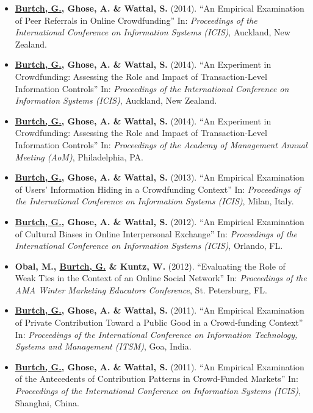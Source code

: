 \documentclass[10.5pt,letterpaper,sans]{moderncv}        %
\begin{document}
\begin{itemize}
\item \textbf{\underline{Burtch, G.}, Ghose, A. \& Wattal, S.} (2014). ``An Empirical Examination of Peer Referrals in Online Crowdfunding'' In: \textit{Proceedings of the International Conference on Information Systems (ICIS)}, Auckland, New Zealand.

\item \textbf{\underline{Burtch, G.}, Ghose, A. \& Wattal, S.} (2014). ``An Experiment in Crowdfunding: Assessing the Role and Impact of Transaction-Level Information Controls'' In: \textit{Proceedings of the International Conference on Information Systems (ICIS)}, Auckland, New Zealand.

\item \textbf{\underline{Burtch, G.}, Ghose, A. \& Wattal, S.} (2014). ``An Experiment in Crowdfunding: Assessing the Role and Impact of Transaction-Level Information Controls'' In: \textit{Proceedings of the Academy of Management Annual Meeting (AoM)}, Philadelphia, PA.

\item \textbf{\underline{Burtch, G.}, Ghose, A. \& Wattal, S.} (2013). ``An Empirical Examination of Users' Information Hiding in a Crowdfunding Context'' In: \textit{Proceedings of the International Conference on Information Systems (ICIS)}, Milan, Italy.

\item \textbf{\underline{Burtch, G.}, Ghose, A. \& Wattal, S.} (2012). ``An Empirical Examination of Cultural Biases in Online Interpersonal Exchange'' In: \textit{Proceedings of the International Conference on Information Systems (ICIS)}, Orlando, FL.

\item \textbf{Obal, M., \underline{Burtch, G.} \& Kuntz, W.} (2012). ``Evaluating the Role of Weak Ties in the Context of an Online Social Network'' In: \textit{Proceedings of the AMA Winter Marketing Educators Conference}, St. Petersburg, FL.

\item \textbf{\underline{Burtch, G.}, Ghose, A. \& Wattal, S.} (2011). ``An Empirical Examination of Private Contribution Toward a Public Good in a Crowd-funding Context'' In: \textit{Proceedings of the International Conference on Information Technology, Systems and Management (ITSM)}, Goa, India.

\item \textbf{\underline{Burtch, G.}, Ghose, A. \& Wattal, S.} (2011). ``An Empirical Examination of the Antecedents of Contribution Patterns in Crowd-Funded Markets'' In: \textit{Proceedings of the International Conference on Information Systems (ICIS)}, Shanghai, China.


\end{itemize}
\end{document}
